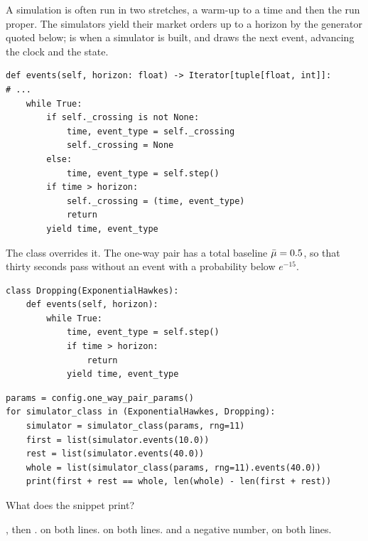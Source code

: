 \begin{question}
\label{question.eventsHoldTheCrossingEvent}
A simulation is often run in two stretches,
a warm-up to a time and then the run proper.
The simulators yield their market orders up to a horizon by the generator quoted below;
 is  when a simulator is built,
and  draws the next event, advancing the clock and the state.
\begin{lstlisting}[caption={\protect\codehl{unito26.lob.hawkes.\_HawkesState.events}, its docstring elided.}, label=listing.eventsHoldTheCrossingEventQuote]
def events(self, horizon: float) -> Iterator[tuple[float, int]]:
# ...
    while True:
        if self._crossing is not None:
            time, event_type = self._crossing
            self._crossing = None
        else:
            time, event_type = self.step()
        if time > horizon:
            self._crossing = (time, event_type)
            return
        yield time, event_type
\end{lstlisting}
The class  overrides it.
The one-way pair has a total baseline $\bar{\mu} = 0.5$,
so that thirty seconds pass without an event with a probability below $e^{-15}$.
\begin{lstlisting}[caption={A simulator that drops the event past the horizon}, label=listing.eventsHoldTheCrossingEventVariant]
class Dropping(ExponentialHawkes):
    def events(self, horizon):
        while True:
            time, event_type = self.step()
            if time > horizon:
                return
            yield time, event_type
\end{lstlisting}
\begin{lstlisting}[caption={Two stretches against one run}, label=listing.eventsHoldTheCrossingEventRun]
params = config.one_way_pair_params()
for simulator_class in (ExponentialHawkes, Dropping):
    simulator = simulator_class(params, rng=11)
    first = list(simulator.events(10.0))
    rest = list(simulator.events(40.0))
    whole = list(simulator_class(params, rng=11).events(40.0))
    print(first + rest == whole, len(whole) - len(first + rest))
\end{lstlisting}
What does the snippet print?
\begin{choices}
 \correctchoice {}, then .
 \choice {} on both lines.
 \choice {} on both lines.
 \choice {} and a negative number, on both lines.
\end{choices}
\end{question}

